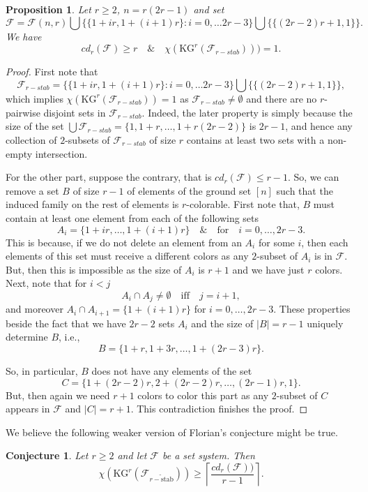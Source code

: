 \documentclass[preprint,12pt,3p]{elsarticle}
\newtheorem{proposition}[theorem]{Proposition}
\newtheorem*{conjecture*}{Conjecture}
\begin{document}
\begin{proposition}
Let $r\geq 2$, $n=r(2r-1)$ and set
$$\mathcal{F}=\mathcal{F}(n,r)\bigcup\{\{1+ir, 1+(i+1)r\} : i=0, \ldots 2r-3\}\bigcup\{\{(2r-2)r+1, 1\}\}.$$
We have
$$cd_r(\mathcal{F})\geq r\quad \&\quad \chi(\textrm{KG}^{r}(\mathcal{F}_{r-stab})))=1.$$
\end{proposition}
\begin{proof}
First note that
$$\mathcal{F}_{r-stab}=\{\{1+ir, 1+(i+1)r\} : i=0, \ldots 2r-3\}\bigcup\{\{(2r-2)r+1, 1\}\},$$
which implies $\chi\left(\textrm{KG}^{r}\left(\mathcal{F}_{r-stab}\right)\right)=1$ as
$\mathcal{F}_{r-stab}\neq\emptyset$ and
there are no $r$-pairwise disjoint sets in $\mathcal{F}_{r-stab}$. Indeed, the later property is simply because the size of the set $\bigcup \mathcal{F}_{r-stab}=\{1, 1+r, \ldots, 1+r(2r-2)\}$ is $2r-1$, and hence any collection of $2$-subsets of $\mathcal{F}_{r-stab}$ of size $r$ contains at least two sets with a non-empty intersection.  

For the other part, suppose the contrary, that is $cd_r\left(\mathcal{F}\right)\leq r-1$. So, we can remove a set $B$ of size $r-1$ of elements of the ground set $[n]$ such that the induced family on the rest of elements is $r$-colorable. First note that, $B$ must contain at least one element from each of the following sets
$$A_i=\{1+ir,\ldots , 1+\left(i+1\right)r\}\quad \&\quad \text{for}\quad i=0, \ldots, 2r-3.$$
This is because, if we do not delete an element from an $A_i$ for some $i$, then each elements of this set must receive a different colors as any $2$-subset of $A_i$ is in $\mathcal{F}$. But, then this is impossible as the size of $A_i$ is $r+1$ and we have just $r$ colors. Next, note that for $i < j$
$$A_i\cap A_j\neq\emptyset\quad\text{iff}\quad j= i+1,$$
and moreover $A_i\cap A_{i+1}=\{1+\left(i+1\right)r\}$ for $i=0, \ldots, 2r-3$.
These properties beside the fact that we have $2r-2$ sets $A_i$ and the size of $|B|=r-1$ uniquely determine $B$, i.e.,
$$B=\{1+r, 1+3r,\ldots, 1+\left(2r-3\right)r\}.$$

So, in particular, $B$ does not have any elements of the set  
$$C=\{1+\left(2r-2\right)r, 2+\left(2r-2\right)r, \ldots, \left(2r-1\right)r, 1 \}.$$ 
But, then again we need $r+1$ colors to color this part as any $2$-subset of $C$ appears in $\mathcal{F}$ and $|C|=r+1$. This contradiction finishes the proof. 
\end{proof}




We believe the following weaker version of Florian's conjecture might be true.
\begin{conjecture*}\label{Conj}
 Let $r\geq 2$ and let $\mathcal{F}$ be a set system. Then
 $$\chi\left(\textrm{KG}^r\left(\mathcal{F}_{\widetilde{r-\text{stab}}}\right)\right)\geq\left\lceil\frac{cd_r\left(\mathcal{F}\right))}{r-1}\right\rceil.$$
\end{conjecture*}
\end{document}
